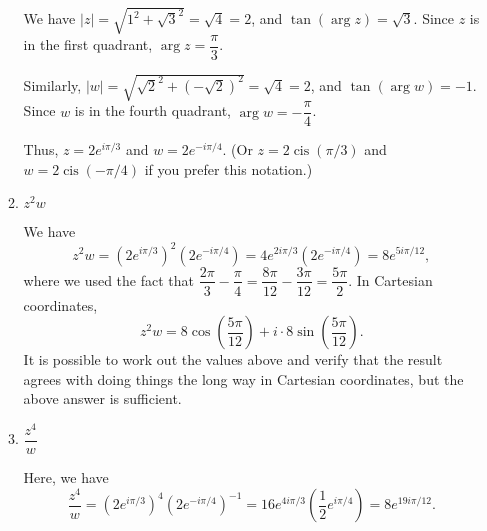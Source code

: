 \documentclass[12pt]{article}
\newcommand{\abs}[1]{\lvert #1\rvert}
\DeclareMathOperator{\cis}{cis}
\begin{document}
\begin{enumerate}
\begin{enumerate}
\medskip

We have $\abs{z} = \sqrt{1^2+\sqrt{3}^2} = \sqrt{4}=2$, and $\tan(\arg z) = \sqrt{3}$. Since $z$ is in the first quadrant, $\arg z = \dfrac{\pi}{3}$.

Similarly, $\abs{w} = \sqrt{\sqrt{2}^2+(-\sqrt{2})^2} = \sqrt{4}=2$, and $\tan(\arg w) = -1$. Since $w$ is in the fourth quadrant, $\arg w = -\dfrac{\pi}{4}$.

Thus, $z = 2e^{i\pi/3}$ and $w = 2e^{-i\pi/4}$. (Or $z=2\cis(\pi/3)$ and $w=2\cis(-\pi/4)$ if you prefer this notation.)


 \item $z^2w$ 

\medskip

We have
\[
 z^2w = (2e^{i\pi/3})^2(2e^{-i\pi/4}) = 4e^{2i\pi/3}(2e^{-i\pi/4}) = 8e^{5i\pi/12},
\]
where we used the fact that $\dfrac{2\pi}{3}-\dfrac{\pi}{4} = \dfrac{8\pi}{12}-\dfrac{3\pi}{12} = \dfrac{5\pi}{2}$. In Cartesian coordinates,
\[
 z^2w = 8\cos\left(\frac{5\pi}{12}\right)+i \cdot 8\sin\left(\frac{5\pi}{12}\right).
\]
It is possible to work out the values above and verify that the result agrees with doing things the long way in Cartesian coordinates, but the above answer is sufficient.

 \item $\dfrac{z^4}{w}$

Here, we have
\[
 \frac{z^4}{w} = (2e^{i\pi/3})^4(2e^{-i\pi/4})^{-1} = 16e^{4i\pi/3}\left(\frac{1}{2}e^{i\pi/4}\right) = 8e^{19i\pi/12}.
\]

\vspace{2.25cm}



\end{enumerate}

 \end{enumerate}
\end{document}
